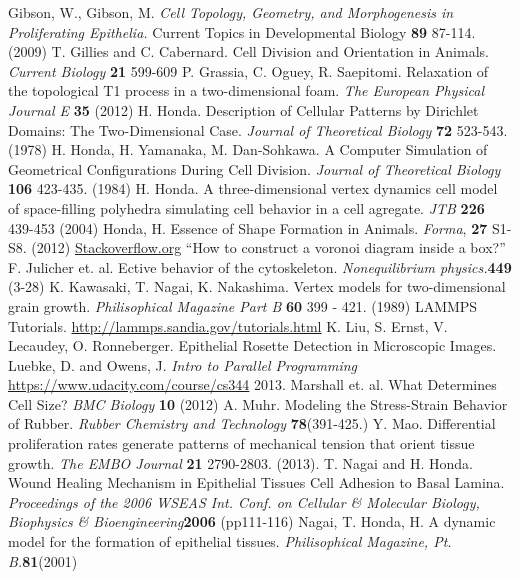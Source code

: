 \begin{thebibliography}{1}
 Gibson, W., Gibson, M. \emph{Cell Topology, Geometry, and Morphogenesis  in Proliferating Epithelia.} Current Topics in Developmental Biology \textbf{89} 87-114. (2009)
 T. Gillies and C. Cabernard. Cell Division and Orientation in Animals. \emph{Current Biology} \textbf{21} 599-609
 P. Grassia, C. Oguey, R. Saepitomi. Relaxation of the topological T1 process in a two-dimensional foam. \emph{The European Physical Journal E} \textbf{35} (2012)
 H. Honda. Description of Cellular Patterns by Dirichlet Domains: The Two-Dimensional Case. \emph{Journal of Theoretical Biology} \textbf{72} 523-543. (1978)
 H. Honda, H. Yamanaka, M. Dan-Sohkawa. A Computer Simulation of Geometrical Configurations During Cell Division. \emph{Journal of Theoretical Biology} \textbf{106} 423-435. (1984)
 H. Honda. A three-dimensional vertex dynamics cell model of space-filling polyhedra simulating cell behavior in a cell agregate. \emph{JTB} \textbf{226} 439-453 (2004)
 Honda, H. Essence of Shape Formation in Animals. \emph{Forma}, \textbf{27} S1-S8. (2012)
 \url{Stackoverflow.org} ``How to construct a voronoi diagram inside a box?''
 F. Julicher et. al. Ective behavior  of the cytoskeleton. \emph{Nonequilibrium physics.}\textbf{449} (3-28)
 K. Kawasaki, T. Nagai, K. Nakashima. Vertex models for two-dimensional grain growth. \emph{Philisophical Magazine Part B} \textbf{60} 399 - 421. (1989)
 LAMMPS Tutorials. \url{http://lammps.sandia.gov/tutorials.html}
 K. Liu, S. Ernst, V. Lecaudey, O. Ronneberger. Epithelial Rosette Detection in Microscopic Images.
 Luebke, D. and Owens, J. \emph{Intro to Parallel Programming} \url{https://www.udacity.com/course/cs344} 2013.
 Marshall et. al. What Determines Cell Size? \emph{BMC Biology} \textbf{10} (2012)
 A. Muhr. Modeling the Stress-Strain Behavior of Rubber.  \emph{Rubber Chemistry and Technology} \textbf{78}(391-425.)
 Y. Mao. Differential proliferation rates generate patterns of mechanical tension that orient tissue growth. \emph{The EMBO Journal} \textbf{21} 2790-2803. (2013).
 T. Nagai and H. Honda. Wound Healing Mechanism in Epithelial Tissues Cell Adhesion to Basal Lamina. \emph{Proceedings of the 2006 WSEAS Int. Conf. on Cellular \& Molecular Biology, Biophysics \& Bioengineering}\textbf{2006} (pp111-116)
 Nagai, T. Honda, H. A dynamic model for the formation of epithelial tissues. \emph{Philisophical Magazine, Pt. B.}\textbf{81}(2001) 

\end{thebibliography}
